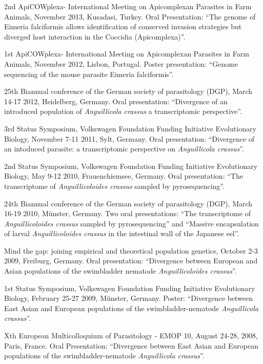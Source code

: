 \documentclass[10pt,a4paper]{article}
\renewenvironment{itemize}{
  \begin{list}{}{
    \setlength{\leftmargin}{2.5em}
    \setlength{\itemsep}{0.25em}
    \setlength{\parskip}{0pt}
    \setlength{\parsep}{0.25em}
  }
}{
  \end{list}
}
\begin{document}
\begin{itemize}


\item 2nd ApiCOWplexa- International Meeting on Apicomplexan Parasites
  in Farm Animals, November 2013, Kusadasi, Turkey. Oral Presentation:
  ``The genome of Eimeria falciformis allows identification of
  conserved invasion strategies but diverged host interaction in the
  Coccidia (Apicomplexa)''. 
  
\item 1st ApiCOWplexa- International Meeting on Apicomplexan Parasites
  in Farm Animals, November 2012, Lisbon, Portugal. Poster
  presentation: ``Genome sequencing of the mouse parasite Eimeria
  falciformis''.

\item 25th Biannual conference of the German society of parasitology
  (DGP), March 14-17 2012, Heidelberg, Germany. Oral presentation:
  ``Divergence of an introduced population of \textit{Anguillicola
    crassus} a transcriptomic perspective''.

\item 3rd Status Symposium, Volkswagen Foundation Funding Initiative
  Evolutionary Biology, November 7-11 2011, Sylt, Germany. Oral
  presentation: ``Divergence of an intoduced parasite: a
  transcriptomic perspective on \textit{Anguillicola crassus}''.

\item 2nd Status Symposium, Volkswagen Foundation Funding Initiative
  Evolutionary Biology, May 9-12 2010, Frauenchiemsee, Germany. Oral
  presentation: ``The transcriptome of \textit{Anguillicoloides
    crassus} sampled by pyrosequencing''.

\item 24th Biannual conference of the German society of parasitology
  (DGP), March 16-19 2010, M\"unster, Germany. Two oral presentations:
  ``The transcriptome of \textit{Anguillicoloides crassus} sampled by
  pyrosequencing'' and ``Massive encapsulation of larval
  \textit{Anguillicoloides crassus} in the intestinal wall of the
  Japanese eel''.

\item Mind the gap: joining empirical and theoretical population
  genetics, October 2-3 2009, Freiburg, Germany. Oral presentation:
  ``Divergence between European and Asian populations of the
  swimbladder nematode \textit{Anguillicoloides crassus}''.

\item 1st Status Symposium, Volkswagen Foundation Funding Initiative
  Evolutionary Biology, February 25-27 2009, M\"unster,
  Germany. Poster: ``Divergence between East Asian and European
  populations of the swimbladder-nematode \textit{Anguillicola
    crassus}''.

\item Xth European Multicolloquium of Parasitology - EMOP 10, August
  24-28, 2008, Paris, France. Oral Presentation: ``Divergence between
  East Asian and European populations of the swimbladder-nematode
  \textit{Anguillicola crassus}''.

\end{itemize}
\end{document}
